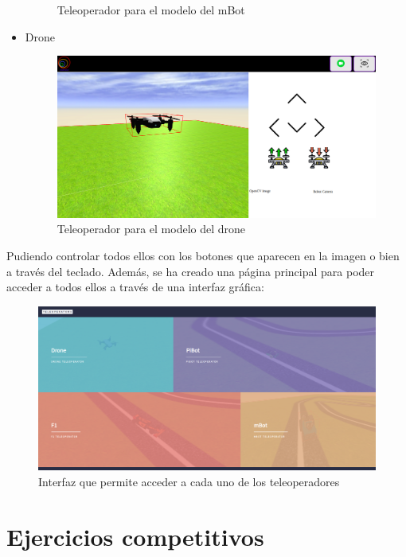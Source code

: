 \begin{itemize}
\begin{figure}[H]
            \caption{Teleoperador para el modelo del mBot} \label{fig:mBot_teleoperator}
        \end{figure}
    \item Drone
        \begin{figure}[H]
            \centering
            \includegraphics[scale=0.3]{img/drone_teleoperator.png}
            \caption{Teleoperador para el modelo del drone} \label{fig:drone_teleoperator}
        \end{figure}
    
\end{itemize}
Pudiendo controlar todos ellos con los botones que aparecen en la imagen o bien a través del teclado. 
Además, se ha creado una página principal para poder acceder a todos ellos a través de una interfaz gráfica: 

 \begin{figure}[H]
    \centering
    \includegraphics[scale=0.25]{img/teleoperators.png}
    \caption{Interfaz que permite acceder a cada uno de los teleoperadores} \label{fig:teleoperators}
\end{figure}

\section{Ejercicios competitivos}

